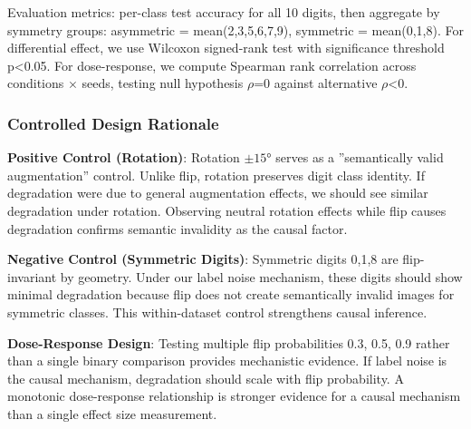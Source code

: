 Evaluation metrics: per-class test accuracy for all 10 digits, then aggregate by symmetry groups: asymmetric = mean({2,3,5,6,7,9}), symmetric = mean({0,1,8}). For differential effect, we use Wilcoxon signed-rank test with significance threshold p<0.05. For dose-response, we compute Spearman rank correlation across conditions $\times$ seeds, testing null hypothesis $\rho$=0 against alternative $\rho$<0.

\subsubsection{Controlled Design Rationale}

\textbf{Positive Control (Rotation)}: Rotation $\pm 15$° serves as a ''semantically valid augmentation'' control. Unlike flip, rotation preserves digit class identity. If degradation were due to general augmentation effects, we should see similar degradation under rotation. Observing neutral rotation effects while flip causes degradation confirms semantic invalidity as the causal factor.

\textbf{Negative Control (Symmetric Digits)}: Symmetric digits {0,1,8} are flip-invariant by geometry. Under our label noise mechanism, these digits should show minimal degradation because flip does not create semantically invalid images for symmetric classes. This within-dataset control strengthens causal inference.

\textbf{Dose-Response Design}: Testing multiple flip probabilities {0.3, 0.5, 0.9} rather than a single binary comparison provides mechanistic evidence. If label noise is the causal mechanism, degradation should scale with flip probability. A monotonic dose-response relationship is stronger evidence for a causal mechanism than a single effect size measurement.

